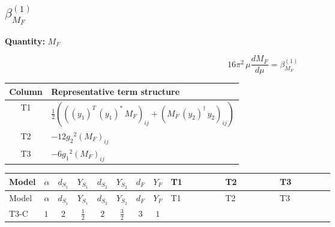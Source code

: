 \documentclass[8pt]{article}
\begin{document}
\begin{landscape}
\section*{$\beta_{M_F}^{(1)}$}
\noindent\textbf{Quantity: }$M_F$\par\smallskip
\[16\pi^2\,\mu\frac{d M_F}{d\mu}=\beta_{M_F}^{(1)}\]
\begin{center}
\begin{tabular}{@{}c >{\raggedright\arraybackslash}p{0.82\linewidth}@{}}
\toprule
Column & Representative term structure \\
\midrule
T1 & \(\displaystyle \frac{1}{2} (\left(\left({y_1}\right)^{T}\,\left({y_1}\right)^{*}\,{M_F}\right)_{ij}+\left({M_F}\,\left({y_2}\right)^{\dagger}\,{y_2}\right)_{ij})\) \\
\midrule
T2 & \(\displaystyle -12 {g_2}^2 \left({M_F}\right)_{ij}\) \\
\midrule
T3 & \(\displaystyle -6 {g_1}^2 \left({M_F}\right)_{ij}\) \\
\midrule
\bottomrule
\end{tabular}
\end{center}
\smallskip
\tiny
\begin{longtable}{@{}llcccccc >{\raggedright\arraybackslash}p{0.21\linewidth} >{\raggedright\arraybackslash}p{0.21\linewidth} >{\raggedright\arraybackslash}p{0.21\linewidth}@{}}
\toprule
Model & $\alpha$ & $d_{S_1}$ & $Y_{S_1}$ & $d_{S_2}$ & $Y_{S_2}$ & $d_F$ & $Y_F$ & T1 & T2 & T3 \\
\midrule
\endfirsthead
\toprule
Model & $\alpha$ & $d_{S_1}$ & $Y_{S_1}$ & $d_{S_2}$ & $Y_{S_2}$ & $d_F$ & $Y_F$ & T1 & T2 & T3 \\
\midrule
\endhead
T3-C & $1$ & $2$ & $\frac{1}{2}$ & $2$ & $\frac{3}{2}$ & $3$ & $1$ & \scriptsize\adjustbox{max width=\linewidth}{$\begin{gathered} \frac{1}{2} (\left(\left({y_1}\right)^{T}\,\left({y_1}\right)^{*}\,{M_F}\right)_{ij}+\left({M_F}\,\left({y_2}\right)^{\dagger}\,{y_2}\right)_{ij})\end{gathered}$} & \scriptsize\adjustbox{max width=\linewidth}{$\begin{gathered} -12 {g_2}^2 \left({M_F}\right)_{ij}\end{gathered}$} & \scriptsize\adjustbox{max width=\linewidth}{$\begin{gathered} -6 {g_1}^2 \left({M_F}\right)_{ij}\end{gathered}$} \\
\midrule
\bottomrule
\end{longtable}
\clearpage

\end{landscape}
\end{document}
